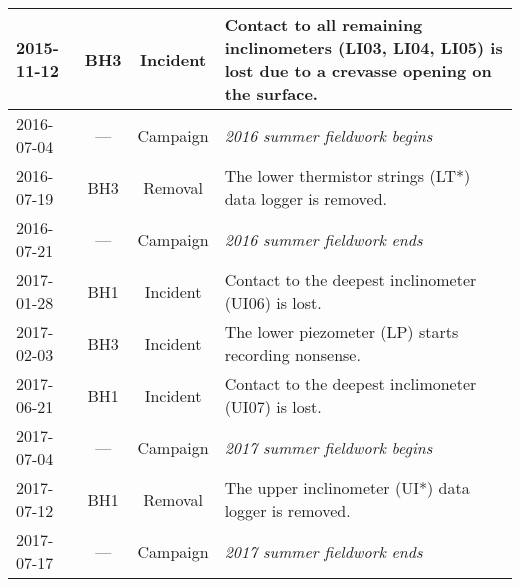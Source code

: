 \documentclass[utf8]{article}
\begin{document}
\begin{table}
{\begin{tabular}{lccp{95mm}}
        2015-11-12 & BH3  & Incident & Contact to all remaining inclinometers
                                       (LI03, LI04, LI05) is lost due to
                                       a crevasse opening on the surface. \\
        \hline
        2016-07-04 & ---  & Campaign & \emph{2016 summer fieldwork begins} \\
        2016-07-19 & BH3  & Removal  & The lower thermistor strings (LT*) data
                                       logger is removed. \\
        2016-07-21 & ---  & Campaign & \emph{2016 summer fieldwork ends} \\
        \hline
        2017-01-28 & BH1  & Incident & Contact to the deepest inclinometer
                                       (UI06) is lost. \\
        2017-02-03 & BH3  & Incident & The lower piezometer (LP) starts
                                       recording nonsense. \\
        2017-06-21 & BH1  & Incident & Contact to the deepest inclimoneter
                                       (UI07) is lost. \\
        \hline
        2017-07-04 & ---  & Campaign & \emph{2017 summer fieldwork begins} \\
        2017-07-12 & BH1  & Removal  & The upper inclinometer (UI*) data logger
                                       is removed. \\
        2017-07-17 & ---  & Campaign & \emph{2017 summer fieldwork ends} \\
        \hline
      \end{tabular}}
    \end{table}


\end{document}
